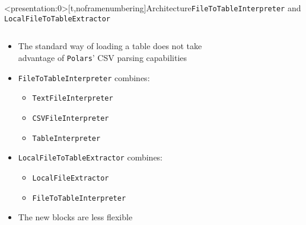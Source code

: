 \begin{frame}<presentation:0>[t,noframenumbering]{Architecture}{\Verb|FileToTableInterpreter| and \Verb|LocalFileToTableExtractor|}
	\begin{columns}[T]
		\begin{column}{0.5\linewidth}
			\begin{itemize}
				\item The standard way of loading a table does not take advantage of \Verb|Polars|' CSV parsing capabilities
				\item<2-> \Verb|FileToTableInterpreter| combines:
				      \begin{itemize}
					      \item \Verb|TextFileInterpreter|
					      \item \Verb|CSVFileInterpreter|
					      \item \Verb|TableInterpreter|
				      \end{itemize}
				\item<3-> \Verb|LocalFileToTableExtractor| combines:
				      \begin{itemize}
					      \item \Verb|LocalFileExtractor|
					      \item \Verb|FileToTableInterpreter|
				      \end{itemize}
				\item<4-> The new blocks are less flexible
			\end{itemize}
		\end{column}
		\hfill
		\begin{column}{0.5\linewidth}
			\begin{figure}
				\begin{subfigure}{0.3\linewidth}
					
				\end{subfigure}
				\hfill
				\hfill
			\end{figure}
		\end{column}
	\end{columns}
\end{frame}
